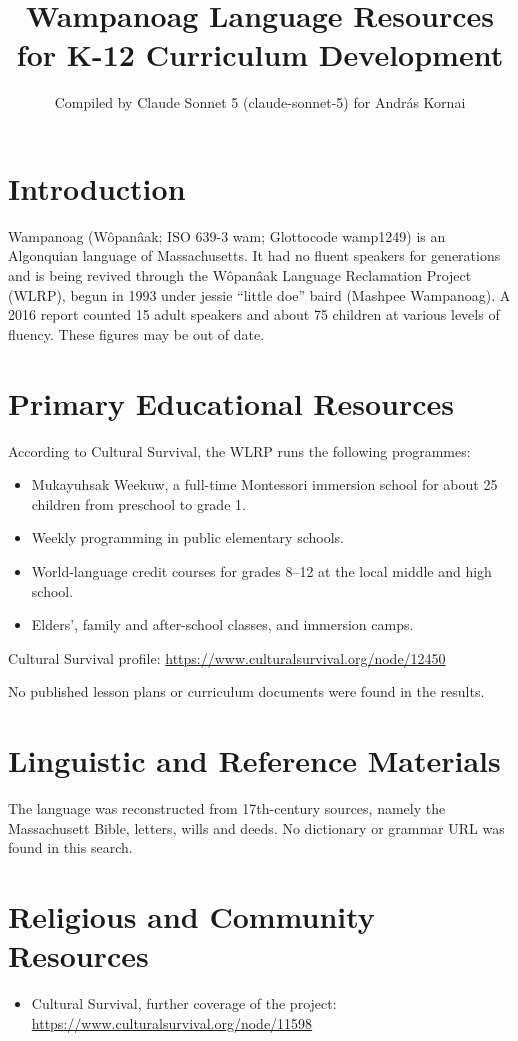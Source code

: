 \documentclass[12pt]{article}
\title{Wampanoag Language Resources for K-12 Curriculum Development}
\author{Compiled by Claude Sonnet 5 (claude-sonnet-5) for Andr\'as Kornai}
\date{}
\begin{document}
\maketitle

\section{Introduction}
Wampanoag (W\^opan\^aak; ISO 639-3 wam; Glottocode wamp1249) is an Algonquian language of Massachusetts. It had no fluent speakers for generations and is being revived through the W\^opan\^aak Language Reclamation Project (WLRP), begun in 1993 under jessie ``little doe'' baird (Mashpee Wampanoag). A 2016 report counted 15 adult speakers and about 75 children at various levels of fluency. These figures may be out of date.

\section{Primary Educational Resources}
According to Cultural Survival, the WLRP runs the following programmes:
\begin{itemize}
\item Mukayuhsak Weekuw, a full-time Montessori immersion school for about 25 children from preschool to grade 1.
\item Weekly programming in public elementary schools.
\item World-language credit courses for grades 8--12 at the local middle and high school.
\item Elders', family and after-school classes, and immersion camps.
\end{itemize}
Cultural Survival profile: \url{https://www.culturalsurvival.org/node/12450}

No published lesson plans or curriculum documents were found in the results.

\section{Linguistic and Reference Materials}
The language was reconstructed from 17th-century sources, namely the Massachusett Bible, letters, wills and deeds. No dictionary or grammar URL was found in this search.

\section{Religious and Community Resources}
\begin{itemize}
\item Cultural Survival, further coverage of the project: \url{https://www.culturalsurvival.org/node/11598}
\end{itemize}
\end{document}
